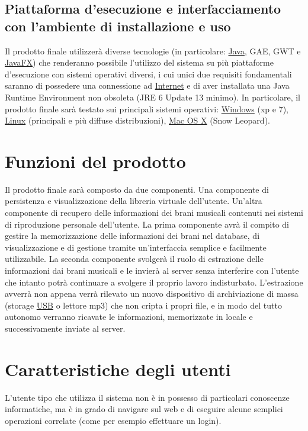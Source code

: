 \subsection{Piattaforma d'esecuzione e interfacciamento con l'ambiente di
installazione e uso}
Il prodotto finale utilizzer\`a diverse tecnologie (in particolare:
\underline{Java}, GAE, GWT e \underline{JavaFX}) che renderanno possibile
l'utilizzo del sistema su pi\`u piattaforme d'esecuzione con sistemi operativi diversi, i cui unici due requisiti
fondamentali saranno di possedere una connessione ad \underline{Internet} e di aver
installata una Java Runtime Environment non obsoleta (JRE 6 Update 13 minimo).
In particolare, il prodotto finale sar\`a testato sui principali sistemi operativi: \underline{Windows} (xp e 7), \underline{Linux} (principali e
pi\`u diffuse distribuzioni), \underline{Mac OS X} (Snow Leopard).
\section{Funzioni del prodotto}
Il prodotto finale sar\`a composto da due componenti. Una componente di
persistenza e visualizzazione della libreria virtuale dell'utente. Un'altra
componente di recupero delle informazioni dei brani musicali contenuti nei
sistemi di riproduzione personale dell'utente. La prima componente avr\`a il
compito di gestire la memorizzazione delle informazioni dei brani nel database,
di visualizzazione e di gestione tramite un'interfaccia semplice e facilmente
utilizzabile. La seconda componente svolger\`a il ruolo di estrazione delle
informazioni dai brani musicali e le invier\`a al server senza interferire con
l'utente che intanto potr\`a continuare a svolgere il proprio lavoro
indisturbato. L'estrazione avverr\`a non appena verr\`a rilevato un nuovo
dispositivo di archiviazione di massa (storage \underline{USB} o lettore mp3)
che non cripta i propri file, e in modo del tutto autonomo verranno ricavate le
informazioni, memorizzate in locale e successivamente inviate al server.

\section{Caratteristiche degli utenti}
L'utente tipo che utilizza il sistema non \`e in possesso di particolari
conoscenze informatiche, ma \`e in grado di navigare sul web e di eseguire alcune
semplici operazioni correlate (come per esempio effettuare un login).

